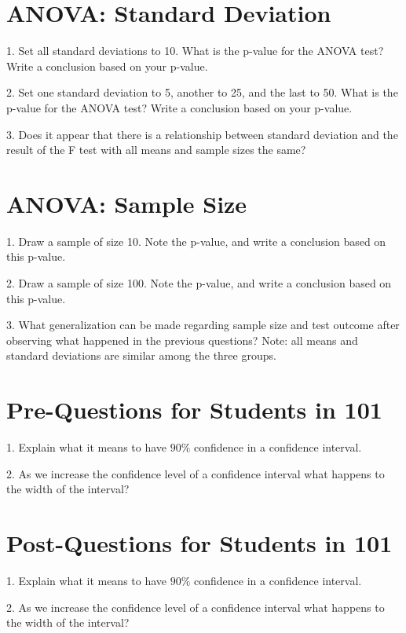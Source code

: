 \documentclass[11pt]{amsart}
\begin{document}
\section{ANOVA: Standard Deviation}

1.  Set all standard deviations to 10.  What is the p-value for the ANOVA test?  Write a conclusion based on your p-value.

2. Set one standard deviation to 5, another to 25, and the last to 50.  What is the p-value for the ANOVA test?  Write a conclusion based on your p-value.

3. Does it appear that there is a relationship between standard deviation and the result of the F test with all means and sample sizes the same?

\section{ANOVA: Sample Size}

1. Draw a sample of size 10.  Note the p-value, and write a conclusion based on this p-value.  

2. Draw a sample of size 100.  Note the p-value, and write a conclusion based on this p-value. 

3.  What generalization can be made regarding sample size and test outcome after observing what happened in the previous questions? Note: all means and standard deviations are similar among the three groups.




\newpage


\section{Pre-Questions for Students in 101}

1. Explain what it means to have $90\%$ confidence in a confidence interval.


2. As we increase the confidence level of a confidence interval what happens to the width of the interval?



\section{Post-Questions for Students in 101}

1. Explain what it means to have $90\%$ confidence in a confidence interval.


2. As we increase the confidence level of a confidence interval what happens to the width of the interval?
\end{document}
